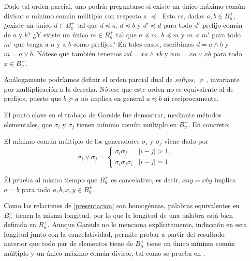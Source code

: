 \documentclass[TFG.tex]{subfiles}
\begin{document}
Dado tal orden parcial, uno podría preguntarse si existe un único máximo común divisor o mínimo común múltiplo con respecto a $\preccurlyeq$. Esto es, dadas $a,b\in B_n^+$, ¿existe un único $d\in B_n^+$ tal que $d\preccurlyeq a$, $d\preccurlyeq b$ y $d'\preccurlyeq d$ para todo $d'$ prefijo común de $a$ y $b$? ¿Y existe un único $m\in B_n^+$ tal que $a\preccurlyeq m$, $b\preccurlyeq m$ y $m\preccurlyeq m'$ para todo $m'$ que tenga a $a$ y a $b$ como prefijos? En tales casos, escribimos $d=a\land b$ y $m=a\lor b$. Nótese que también tenemos $xd=xa\land xb$ y $xm=xa\lor xb$ para todo $x\in B_n^+$.

\begin{nota}
Análogamente podríamos definir el orden parcial dual  de \emph{sufijos}, $\succcurlyeq$, invariante por multiplicación a la derecha. Nótese que este orden no es equivalente al de prefijos, puesto que $b\succcurlyeq a$ no implica en general $a\preccurlyeq b$ ni recíprocamente. 
\end{nota}

El punto clave en el trabajo de Garside fue demostrar, mediante métodos elementales, que $\sigma_i$ y $\sigma_j$ tienen mínimo común múltiplo en $B_n^+$. En concreto:
\begin{prop} 
El mínimo común múltiplo de los generadores $\sigma_i$ y $\sigma_j$ viene dado por
$$\sigma_i\lor\sigma_j=\begin{cases}
\sigma_i\sigma_j & |i-j|>1,\\
\sigma_i\sigma_j\sigma_i & |i-j|=1.
\end{cases}$$
\end{prop}

Él prueba al mismo tiempo que $B_n^+$ es cancelativo, es decir, $xay=xby$ implica $a=b$ para todo $a,b,x,y\in B_n^+$.

Como las relaciones de \ref{presentacion} son homogéneas, palabras equivalentes en $B_n^+$ tienen la misma longitud, por lo que la longitud de una palabra está bien definida en $B_n^+$. Aunque Garside no lo menciona explícitamente, inducción en esta longitud junto con la cancelatividad, permite probar a partir del resultado anterior que todo par de elementos tiene de $B_n^+$ tiene un único mínimo común múltiplo y un único máximo común divisor, tal como se prueba en \cite{Dehornoy}. 
\end{document}
